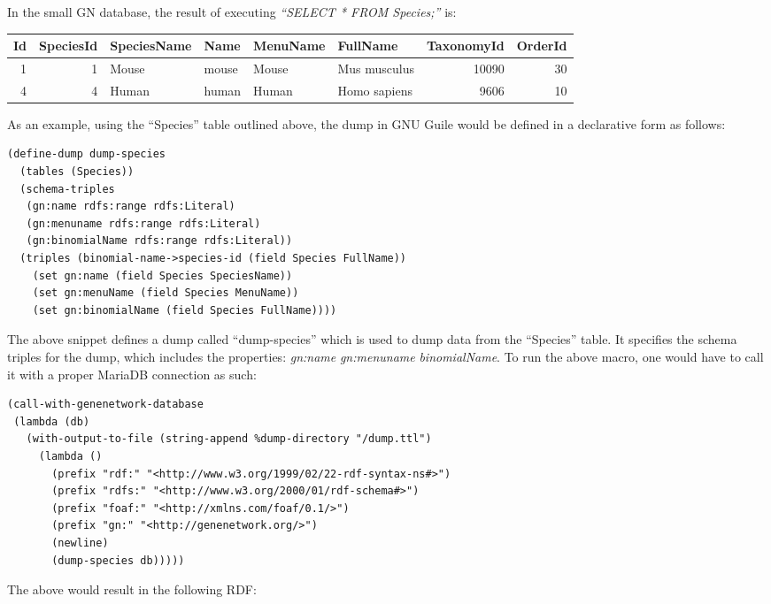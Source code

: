 In the small GN database, the result of executing \textit{``SELECT * FROM Species;''} is:

\begin{center}
\begin{tabular}{rrllllrr}
Id & SpeciesId & SpeciesName & Name & MenuName & FullName & TaxonomyId & OrderId\\
\hline
1 & 1 & Mouse & mouse & Mouse & Mus musculus & 10090 & 30\\
4 & 4 & Human & human & Human & Homo sapiens & 9606 & 10\\
\hline
\end{tabular}
\end{center}


As an example, using the ``Species'' table outlined above, the dump in GNU Guile would be defined in a declarative form as follows:

\begin{verbatim}
(define-dump dump-species
  (tables (Species))
  (schema-triples
   (gn:name rdfs:range rdfs:Literal)
   (gn:menuname rdfs:range rdfs:Literal)
   (gn:binomialName rdfs:range rdfs:Literal))
  (triples (binomial-name->species-id (field Species FullName))
    (set gn:name (field Species SpeciesName))
    (set gn:menuName (field Species MenuName))
    (set gn:binomialName (field Species FullName))))
\end{verbatim}

The above snippet defines a dump called ``dump-species'' which is used to dump data from the ``Species'' table.  It specifies the schema triples for the dump, which includes the properties: \textit{gn:name} \textit{gn:menuname} \textit{binomialName}.  To run the above macro, one would have to call it with a proper MariaDB connection as such:

\begin{verbatim}
(call-with-genenetwork-database
 (lambda (db)
   (with-output-to-file (string-append %dump-directory "/dump.ttl")
     (lambda ()
       (prefix "rdf:" "<http://www.w3.org/1999/02/22-rdf-syntax-ns#>")
       (prefix "rdfs:" "<http://www.w3.org/2000/01/rdf-schema#>")
       (prefix "foaf:" "<http://xmlns.com/foaf/0.1/>")
       (prefix "gn:" "<http://genenetwork.org/>")
       (newline)
       (dump-species db)))))
\end{verbatim}

The above would result in the following RDF:

